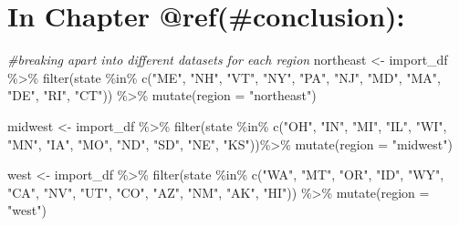 \documentclass[12pt, twoside]{amherstthesis}
\newenvironment{Shaded}{\begin{snugshade}}{\end{snugshade}}
\newcommand{\AttributeTok}[1]{\textcolor[rgb]{0.77,0.63,0.00}{#1}}
\newcommand{\CommentTok}[1]{\textcolor[rgb]{0.56,0.35,0.01}{\textit{#1}}}
\newcommand{\FunctionTok}[1]{\textcolor[rgb]{0.00,0.00,0.00}{#1}}
\newcommand{\NormalTok}[1]{#1}
\newcommand{\OtherTok}[1]{\textcolor[rgb]{0.56,0.35,0.01}{#1}}
\newcommand{\SpecialCharTok}[1]{\textcolor[rgb]{0.00,0.00,0.00}{#1}}
\newcommand{\StringTok}[1]{\textcolor[rgb]{0.31,0.60,0.02}{#1}}
\begin{document}
\hypertarget{in-chapter-refconclusion}{%
\section{In Chapter @ref(\#conclusion):}\label{in-chapter-refconclusion}}
\begin{Shaded}
\begin{Highlighting}[]
\CommentTok{\#breaking apart into different datasets for each region}
\NormalTok{northeast }\OtherTok{\textless{}{-}}\NormalTok{ import\_df }\SpecialCharTok{\%\textgreater{}\%}
  \FunctionTok{filter}\NormalTok{(state }\SpecialCharTok{\%in\%} \FunctionTok{c}\NormalTok{(}\StringTok{"ME"}\NormalTok{, }\StringTok{"NH"}\NormalTok{, }\StringTok{"VT"}\NormalTok{, }\StringTok{"NY"}\NormalTok{, }\StringTok{"PA"}\NormalTok{, }\StringTok{"NJ"}\NormalTok{, }\StringTok{"MD"}\NormalTok{, }
                      \StringTok{"MA"}\NormalTok{, }\StringTok{"DE"}\NormalTok{, }\StringTok{"RI"}\NormalTok{, }\StringTok{"CT"}\NormalTok{)) }\SpecialCharTok{\%\textgreater{}\%}
  \FunctionTok{mutate}\NormalTok{(}\AttributeTok{region =} \StringTok{"northeast"}\NormalTok{)}

\NormalTok{midwest }\OtherTok{\textless{}{-}}\NormalTok{ import\_df }\SpecialCharTok{\%\textgreater{}\%}
  \FunctionTok{filter}\NormalTok{(state }\SpecialCharTok{\%in\%} \FunctionTok{c}\NormalTok{(}\StringTok{"OH"}\NormalTok{, }\StringTok{"IN"}\NormalTok{, }\StringTok{"MI"}\NormalTok{, }\StringTok{"IL"}\NormalTok{, }\StringTok{"WI"}\NormalTok{, }\StringTok{"MN"}\NormalTok{, }\StringTok{"IA"}\NormalTok{, }
                      \StringTok{"MO"}\NormalTok{, }\StringTok{"ND"}\NormalTok{, }\StringTok{"SD"}\NormalTok{, }\StringTok{"NE"}\NormalTok{, }\StringTok{"KS"}\NormalTok{))}\SpecialCharTok{\%\textgreater{}\%}
  \FunctionTok{mutate}\NormalTok{(}\AttributeTok{region =} \StringTok{"midwest"}\NormalTok{)}

\NormalTok{west }\OtherTok{\textless{}{-}}\NormalTok{ import\_df }\SpecialCharTok{\%\textgreater{}\%}
  \FunctionTok{filter}\NormalTok{(state }\SpecialCharTok{\%in\%} \FunctionTok{c}\NormalTok{(}\StringTok{"WA"}\NormalTok{, }\StringTok{"MT"}\NormalTok{, }\StringTok{"OR"}\NormalTok{, }\StringTok{"ID"}\NormalTok{, }\StringTok{"WY"}\NormalTok{, }\StringTok{"CA"}\NormalTok{, }\StringTok{"NV"}\NormalTok{, }
                      \StringTok{"UT"}\NormalTok{, }\StringTok{"CO"}\NormalTok{, }\StringTok{"AZ"}\NormalTok{, }\StringTok{"NM"}\NormalTok{, }\StringTok{"AK"}\NormalTok{, }\StringTok{"HI"}\NormalTok{)) }\SpecialCharTok{\%\textgreater{}\%}
  \FunctionTok{mutate}\NormalTok{(}\AttributeTok{region =} \StringTok{"west"}\NormalTok{)}


\end{Highlighting}
\end{Shaded}
\end{document}
